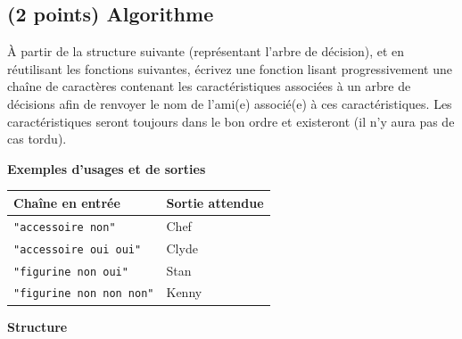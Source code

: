 \documentclass[11pt,a4paper]{article}
\begin{document}
\clearpage


\subsection{(2 points) Algorithme}

\noindent À partir de la structure suivante (représentant l'arbre de décision), et en réutilisant les fonctions suivantes, écrivez une fonction  lisant progressivement une chaîne de caractères contenant les caractéristiques associées à un arbre de décisions afin de renvoyer le nom de l'ami(e) associé(e) à ces caractéristiques.
Les caractéristiques seront toujours dans le bon ordre et existeront (il n'y aura pas de cas tordu).

\bigskip


\noindent \textbf{Exemples d'usages et de sorties}

\begin{center}
\begin{tabular}{|l|l|}
\hline
\textbf{Chaîne en entrée} & \textbf{Sortie attendue} \\
\hline
\texttt{"accessoire non"} & Chef \\ \hline
\texttt{"accessoire oui oui"} & Clyde \\ \hline
\texttt{"figurine non oui"} & Stan \\ \hline
\texttt{"figurine non non non"} & Kenny \\ \hline
\end{tabular}
\end{center}

\medskip


\noindent \textbf{Structure}
\end{document}
